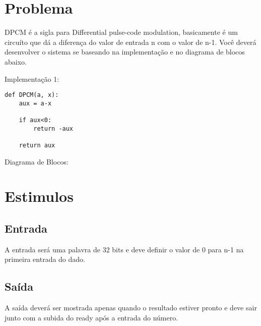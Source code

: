 \documentclass[
    12pt,
    a4paper,
    oneside,
    chapter=TITLE,
    section=TITLE,
    subsection=TITLE,
    subsubsection=TITLE,
    english,
    french,
    spanish,
    brazil,
    ]{abntex2}
\begin{document}
\frenchspacing 
\imprimircapa
\imprimirfolhaderosto

\tableofcontents*
\cleardoublepage

\textual

\chapter{Problema}
DPCM é a sigla para Differential pulse-code modulation, basicamente é um circuíto que dá a diferença do valor de entrada n com o valor de n-1. Você deverá desenvolver o sistema se baseando na implementação e no diagrama de blocos abaixo.

\par
Implementação 1:
\begin{lstlisting}
def DPCM(a, x):
    aux = a-x

    if aux<0:
        return -aux

    return aux
\end{lstlisting}

\par
Diagrama de Blocos:




\chapter{Estimulos}
\section{Entrada}
A entrada será uma palavra de 32 bits e deve definir o valor de 0 para n-1 na primeira entrada do dado.
\section{Saída}
A saída deverá ser mostrada apenas quando o resultado estiver pronto e deve sair junto com a subida do ready após a entrada do número.
\end{document}
